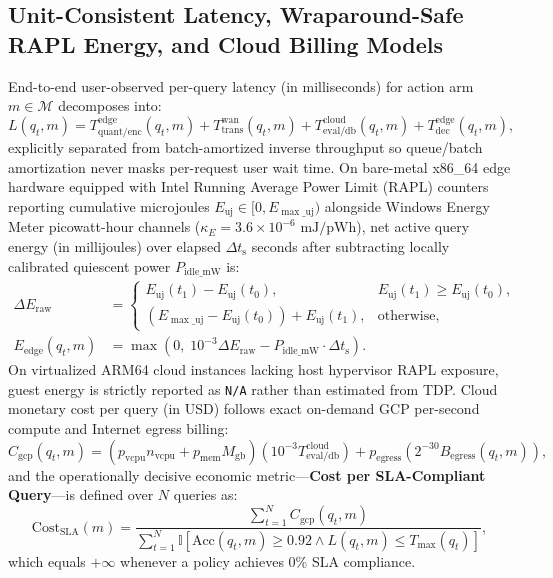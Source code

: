 \documentclass[10pt,journal,compsoc]{IEEEtran}
\begin{document}
\subsection{Unit-Consistent Latency, Wraparound-Safe RAPL Energy, and Cloud Billing Models}
End-to-end user-observed per-query latency (in milliseconds) for action arm $m \in \mathcal{M}$ decomposes into:
\begin{equation}
L(q_t, m) = T_{\text{quant/enc}}^{\text{edge}}(q_t, m) + T_{\text{trans}}^{\text{wan}}(q_t, m) + T_{\text{eval/db}}^{\text{cloud}}(q_t, m) + T_{\text{dec}}^{\text{edge}}(q_t, m),
\end{equation}
explicitly separated from batch-amortized inverse throughput so queue/batch amortization never masks per-request user wait time. On bare-metal x86\_64 edge hardware equipped with Intel Running Average Power Limit (RAPL) counters~\cite{khan2018rapl} reporting cumulative microjoules $E_{\text{uj}} \in [0, E_{\max\_\text{uj}})$ alongside Windows Energy Meter picowatt-hour channels ($\kappa_E = 3.6 \times 10^{-6}\text{ mJ/pWh}$), net active query energy (in millijoules) over elapsed $\Delta t_{\text{s}}$ seconds after subtracting locally calibrated quiescent power $P_{\text{idle\_mW}}$ is:
\begin{align}
\Delta E_{\text{raw}} &= \begin{cases} E_{\text{uj}}(t_1) - E_{\text{uj}}(t_0), & E_{\text{uj}}(t_1) \ge E_{\text{uj}}(t_0), \\ (E_{\max\_\text{uj}} - E_{\text{uj}}(t_0)) + E_{\text{uj}}(t_1), & \text{otherwise}, \end{cases} \\
E_{\text{edge}}(q_t, m) &= \max\!\left(0,\; 10^{-3}\Delta E_{\text{raw}} - P_{\text{idle\_mW}}\cdot \Delta t_{\text{s}}\right).
\end{align}
On virtualized ARM64 cloud instances lacking host hypervisor RAPL exposure, guest energy is strictly reported as \texttt{N/A} rather than estimated from TDP. Cloud monetary cost per query (in USD) follows exact on-demand GCP per-second compute and Internet egress billing:
\begin{equation}
C_{\text{gcp}}(q_t, m) = \left(p_{\text{vcpu}} n_{\text{vcpu}} + p_{\text{mem}} M_{\text{gb}}\right)\!\left(10^{-3} T_{\text{eval/db}}^{\text{cloud}}\right) + p_{\text{egress}}\!\left(2^{-30} B_{\text{egress}}(q_t, m)\right),
\end{equation}
and the operationally decisive economic metric—\textbf{Cost per SLA-Compliant Query}—is defined over $N$ queries as:
\begin{equation}
\text{Cost}_{\text{SLA}}(m) = \frac{\sum_{t=1}^N C_{\text{gcp}}(q_t, m)}{\sum_{t=1}^N \mathbb{I}\!\left[\text{Acc}(q_t, m) \ge 0.92 \land L(q_t, m) \le T_{\max}(q_t)\right]},
\end{equation}
which equals $+\infty$ whenever a policy achieves $0\%$ SLA compliance.
\end{document}

